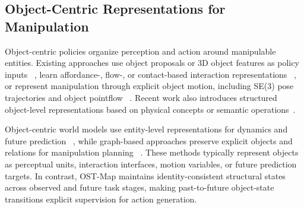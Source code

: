 \subsection{Object-Centric Representations for Manipulation}

Object-centric policies organize perception and action around manipulable
entities. Existing approaches use object
proposals or 3D object features as policy inputs
~\citep{zhu2022viola,zhu2023learning}, learn affordance-, flow-, or
contact-based interaction representations
~\citep{belkhale2023plato,xu2024im2flow2act,Zhang2026AffordGen,
Lee2025ViTaSCOPE}, or represent manipulation through explicit object motion,
including SE(3) pose trajectories and object pointflow
~\citep{Hsu2025SPOT,Yang2025PPI}. Recent work also introduces structured
object-level representations based on physical concepts or
semantic operations~\citep{Wei2026PhysicalConcepts,Tang2026SEAM}.

Object-centric world models use entity-level representations for dynamics and
future prediction
~\citep{ferraro2025focus,jeong2025ocwm}, while graph-based
approaches preserve explicit objects and relations for manipulation planning
~\citep{zhu2026orion}. These methods typically represent objects as perceptual
units, interaction interfaces, motion variables, or future prediction targets.
In contrast, OST-Map maintains identity-consistent structural states across
observed and future task stages, making past-to-future object-state transitions
explicit supervision for action generation.
